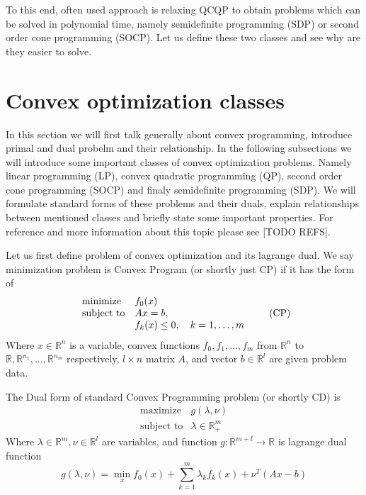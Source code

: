 \documentclass[10pt,oneside]{book}
\theoremstyle{definition}
\begin{document}
To this end, often used approach is relaxing QCQP to obtain problems which can be solved in polynomial time, namely semidefinite programming (SDP) or second order cone programming  (SOCP). Let us define these two classes and see why are they easier to solve.

\section{Convex optimization classes}

In this section we will first talk generally about convex programming, introduce primal and dual probelm and their relationship. In the following subsections we will introduce some important classes of convex optimization problems. Namely linear programming (LP), convex quadratic programming (QP), second order cone programming (SOCP) and finaly semidefinite programming (SDP). 
We will formulate standard forms of these problems and their duals, explain relationships between mentioned classes and briefly state some important properties. For reference and more information about this topic please see [TODO REFS].


Let us first define problem of convex optimization and its lagrange dual.
 We say minimization problem is Convex Program (or shortly just CP) if it has the form of
\label{defCP}
\begin{equation}
\label{CP}
\begin{array}{ll}
\mbox{\rm minimize} & f_0(x) \\
\mbox{\rm subject to}& Ax = b ,  \\
& f_k(x)\leq 0 , \ \ \ k = 1,\dots, m  \\
\end{array} 
\tag{CP}
\end{equation}
Where $x\in \mathbb{R}^n $ is a variable, convex functions $f_0,f_1,\dots ,f_m$ from $\mathbb{R}^n$ to  \\$\mathbb{R},\mathbb{R}^{n_1},\dots ,\mathbb{R}^{n_m}$ respectively, $l\times n$ matrix $A$, and vector $b\in \mathbb{R}^{l}$ are given problem data.

The Dual form of standard Convex Programming problem (or shortly CD) is 
\begin{equation}
\label{CD}
\begin{array}{ll}
\mbox{maximize} & g(\lambda,\nu) \\
\mbox{subject to}& \lambda \in \mathbb{R}^m_+
\end{array} 
\tag{CD}
\end{equation}
Where $\lambda \in \mathbb{R}^m , \nu \in \mathbb{R}^l$ are variables, and function $g: \mathbb{R}^{m+l}\rightarrow \mathbb{R}$ is lagrange dual function 
\begin{equation}
g(\lambda,\nu) = \min_x f_0(x) + \sum_{k=1}^m \lambda_k f_k(x) + \nu^T(Ax-b)
\end{equation}
\end{document}
